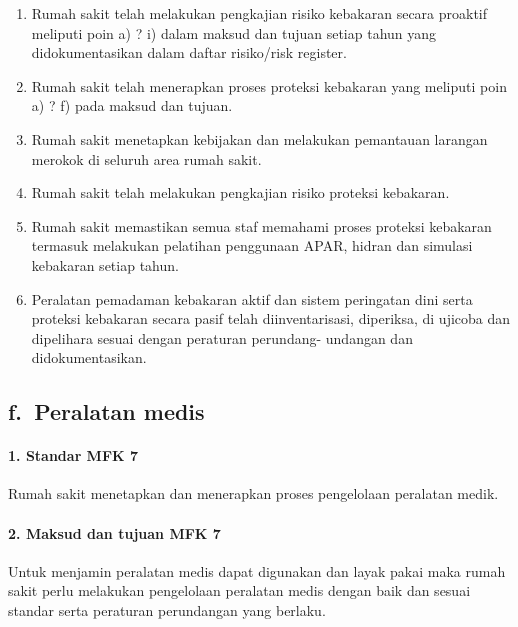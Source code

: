 \documentclass[
]{book}
\providecommand{\tightlist}{%
  \setlength{\itemsep}{0pt}\setlength{\parskip}{0pt}}
\begin{document}
\begin{enumerate}
\def\labelenumi{\alph{enumi}.}
\tightlist
\item
  Rumah sakit telah melakukan pengkajian risiko kebakaran secara proaktif meliputi poin a) ? i) dalam maksud dan tujuan setiap tahun yang didokumentasikan dalam daftar risiko/risk register.
\item
  Rumah sakit telah menerapkan proses proteksi kebakaran yang meliputi poin a) ? f) pada maksud dan tujuan.
\item
  Rumah sakit menetapkan kebijakan dan melakukan pemantauan larangan merokok di seluruh area rumah sakit.
\item
  Rumah sakit telah melakukan pengkajian risiko proteksi kebakaran.
\item
  Rumah sakit memastikan semua staf memahami proses proteksi kebakaran termasuk melakukan pelatihan penggunaan APAR, hidran dan simulasi kebakaran setiap tahun.
\item
  Peralatan pemadaman kebakaran aktif dan sistem peringatan dini serta proteksi kebakaran secara pasif telah diinventarisasi, diperiksa, di ujicoba dan dipelihara sesuai dengan peraturan perundang- undangan dan didokumentasikan.
\end{enumerate}

\hypertarget{f.-peralatan-medis}{%
\subsection*{f.~Peralatan medis}\label{f.-peralatan-medis}}

\hypertarget{standar-mfk-7}{%
\paragraph*{1. Standar MFK 7}\label{standar-mfk-7}}

Rumah sakit menetapkan dan menerapkan proses pengelolaan peralatan medik.

\hypertarget{maksud-dan-tujuan-mfk-7}{%
\paragraph*{2. Maksud dan tujuan MFK 7}\label{maksud-dan-tujuan-mfk-7}}

Untuk menjamin peralatan medis dapat digunakan dan layak pakai maka rumah sakit perlu melakukan pengelolaan peralatan medis dengan baik dan sesuai standar serta peraturan perundangan yang berlaku.
\end{document}
